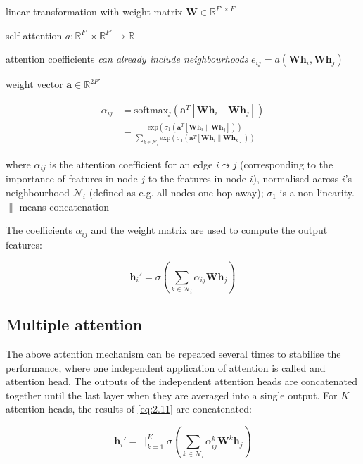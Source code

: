 linear transformation with weight matrix $\mathbf{W} \in \mathbb{R}^{F' \times F}$

self attention $a: \mathbb{R}^{F'} \times \mathbb{R}^{F'} \rightarrow \mathbb{R}$

attention coefficients \textit{can already include neighbourhoods} $e_{ij} = a(\mathbf{W}\mathbf{h}_i, \mathbf{W}\mathbf{h}_j)$



weight vector $\mathbf{a} \in \mathbb{R}^{2F'}$

\begin{align}
    \alpha_{ij} &= \mathrm{softmax}_j(\mathbf{a}^T[\mathbf{W}\mathbf{h}_i \parallel \mathbf{W}\mathbf{h}_j]) \\
    &=  \frac{\mathrm{exp}(\sigma_1(\mathbf{a}^T[\mathbf{W}\mathbf{h}_i \parallel \mathbf{W}\mathbf{h}_j]))}{\sum\limits_{k \in \mathcal{N}_i}\mathrm{exp}(\sigma_1(\mathbf{a}^T[\mathbf{W}\mathbf{h}_i \parallel \mathbf{W}\mathbf{h}_k]))}
\end{align}

where $\alpha_{ij}$ is the attention coefficient for an edge $i\leadsto j$ (corresponding to the importance of features in node $j$ to the features in node $i$), normalised across $i$'s neighbourhood $\mathcal{N}_i$ (defined as e.g. all nodes one hop away); $\sigma_1$ is a non-linearity. $\parallel$ means concatenation

The coefficients $\alpha_{ij}$ and the weight matrix are used to compute the output features:

\begin{equation}
    \mathbf{h}_i' = \sigma(\sum\limits_{k \in \mathcal{N}_i} \alpha_{ij}\mathbf{W}\mathbf{h}_j)\label{eq:2.11}
\end{equation}

\subsection{Multiple attention}
The above attention mechanism can be repeated several times to stabilise the performance, where one independent application of attention is called and attention head. The outputs of the independent attention heads are concatenated together until the last layer when they are averaged into a single output. For $K$ attention heads, the results of \eqref{eq:2.11} are concatenated:

\begin{equation}
    \mathbf{h}_i' = \big\|_{k=1}^{K} \sigma(\sum\limits_{k \in \mathcal{N}_i} \alpha_{ij}^k\mathbf{W}^k\mathbf{h}_j)
\end{equation}

